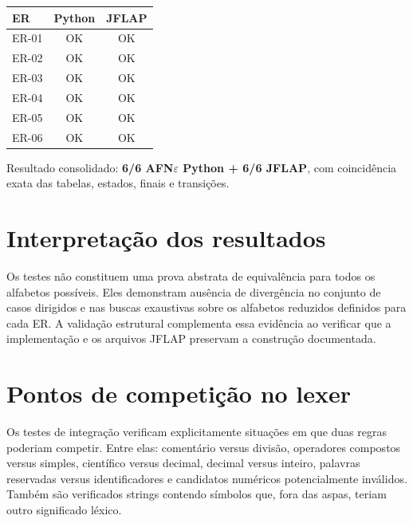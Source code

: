 \begin{center}
\begin{tabular}{lcc}
\toprule
ER & Python & JFLAP \\
\midrule
ER-01 & OK & OK \\
ER-02 & OK & OK \\
ER-03 & OK & OK \\
ER-04 & OK & OK \\
ER-05 & OK & OK \\
ER-06 & OK & OK \\
\bottomrule
\end{tabular}
\end{center}

Resultado consolidado: \textbf{6/6 AFN$\varepsilon$ Python + 6/6 JFLAP}, com coincidência exata das tabelas, estados, finais e transições.

\section{Interpretação dos resultados}

Os testes não constituem uma prova abstrata de equivalência para todos os alfabetos possíveis. Eles demonstram ausência de divergência no conjunto de casos dirigidos e nas buscas exaustivas sobre os alfabetos reduzidos definidos para cada ER. A validação estrutural complementa essa evidência ao verificar que a implementação e os arquivos JFLAP preservam a construção documentada.

\section{Pontos de competição no lexer}

Os testes de integração verificam explicitamente situações em que duas regras poderiam competir. Entre elas: comentário versus divisão, operadores compostos versus simples, científico versus decimal, decimal versus inteiro, palavras reservadas versus identificadores e candidatos numéricos potencialmente inválidos. Também são verificados strings contendo símbolos que, fora das aspas, teriam outro significado léxico.
